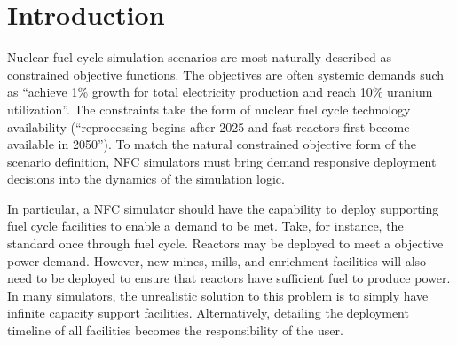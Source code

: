 \section{Introduction}
Nuclear fuel cycle simulation scenarios are most naturally described as 
constrained objective functions. The objectives are often systemic 
demands such as ``achieve 1\% growth for total electricity production 
and reach 10\% uranium utilization''. The constraints take 
the form of nuclear fuel cycle technology availability 
(``reprocessing begins after 2025 and fast reactors first become 
available in 2050''). To match the natural constrained objective form of the 
scenario definition, \gls{NFC} simulators must bring demand responsive 
deployment decisions into the dynamics of the simulation logic.  

In particular, a \gls{NFC} simulator should have the 
capability to deploy supporting fuel cycle facilities to enable 
a demand to be met. Take, for instance, the standard once through fuel 
cycle. Reactors may be deployed to meet a objective power demand. 
However, new mines, mills, and enrichment facilities will also need to be 
deployed to ensure that reactors have sufficient fuel to produce power.  
In many simulators, the unrealistic solution to this problem is to 
simply have infinite capacity support facilities. Alternatively, 
detailing the deployment timeline of all facilities becomes the 
responsibility of the user.
